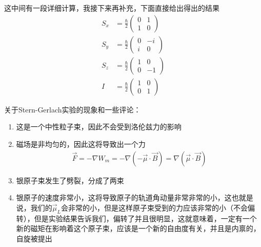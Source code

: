\documentclass{article}
\newcommand{\pmtwo}[4]{\begin{pmatrix}#1&#2\\#3&#4\end{pmatrix}}
\begin{document}
这中间有一段详细计算，我接下来再补充，下面直接给出得出的结果
\begin{align*}
	S_x & =\frac{\hbar}{2}\pmtwo{0}{1}{1}{0}  \\
	S_y & =\frac{\hbar}{2}\pmtwo{0}{-i}{i}{0} \\
	S_z & =\frac{\hbar}{2}\pmtwo{1}{0}{0}{-1} \\
	I   & =\frac{\hbar}{2}\pmtwo{1}{0}{0}{1}
\end{align*}

关于Stern-Gerlach实验的现象和一些评论：
\begin{enumerate}
	\item 这是一个中性粒子束，因此不会受到洛伦兹力的影响
	\item 磁场是非均匀的，因此这将导致出一个力
	      \begin{align*}
		      \vec{F}=-\nabla W_m=-\nabla\left(-\vec{\mu}\cdot\vec{B}\right)=\nabla\left(\vec{\mu}\cdot\vec{B}\right)
	      \end{align*}
	\item 银原子束发生了劈裂，分成了两束
	\item 银原子的速度非常小，这将导致原子的轨道角动量非常非常的小，这也就是说，我们的$\vec{\mu}_L$会非常的小，但是这样原子束受到的力应该非常的小（不会偏转），但是实验结果告诉我们，偏转了并且很明显，这就意味着，一定有一个新的磁矩在影响着这个原子束，应该是一个新的自由度有关，并且是内禀的，自旋被提出
\end{enumerate}


\end{document}
